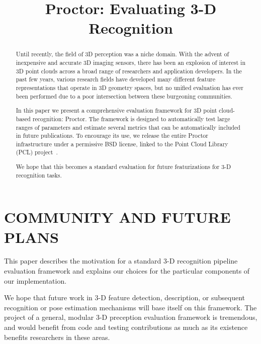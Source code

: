 \documentclass[a4paper, 10pt, conference]{ieeeconf}      %
\title{\LARGE \bf
Proctor: Evaluating 3-D Recognition
}
\begin{document}
\maketitle
\thispagestyle{empty}
\pagestyle{empty}

\begin{abstract}


Until recently, the field of 3D perception was a niche domain. With the advent
of inexpensive and accurate 3D imaging sensors, there has been an explosion of
interest in 3D point clouds across a broad range of researchers and application
developers. In the past few years, various research fields have developed
many different feature representations that operate in 3D geometry spaces, but
no unified evaluation has ever been performed due to a poor intersection between
these burgeoning communities.

In this paper we present a comprehensive evaluation framework for 3D point
cloud-based recognition: Proctor.
The framework is designed to automatically test large ranges of
parameters and estimate several metrics that can be automatically included in
future publications. To encourage its use, we release the entire Proctor
infrastructure under a permissive BSD license, linked to the Point Cloud
Library (PCL) project~\cite{PCL}.


We hope that this becomes a standard evaluation for future featurizations for
3-D recognition tasks.

\end{abstract}







\section{COMMUNITY AND FUTURE PLANS}

This paper describes the motivation for a standard 3-D recognition pipeline
evaluation framework and explains our choices for the particular components of
our implementation.

We hope that future work in 3-D feature detection, description, or subsequent
recognition or pose estimation mechanisms will base itself on this framework.
The project of a general, modular 3-D preception evaluation framework is
tremendous, and would benefit from code and testing contributions as much as its
existence benefits researchers in these areas.
\end{document}
